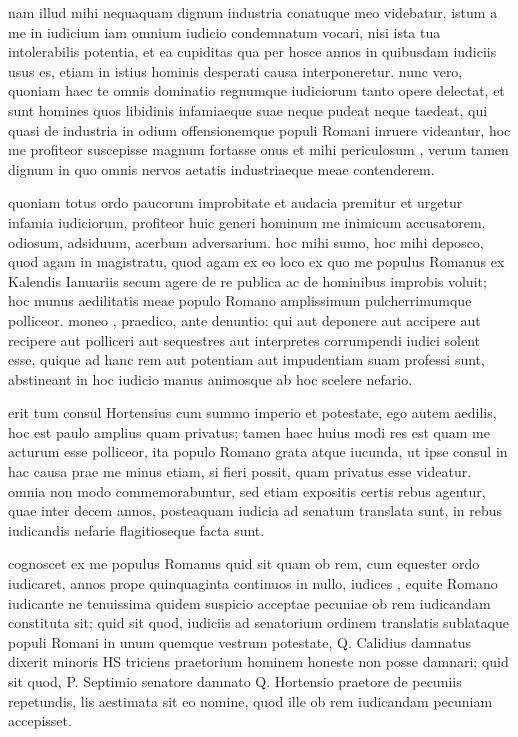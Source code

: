  nam illud mihi nequaquam dignum industria conatuque meo videbatur, istum a me in iudicium iam omnium iudicio condemnatum vocari, nisi ista tua intolerabilis potentia, et ea cupiditas qua per hosce annos in quibusdam iudiciis usus es, etiam in istius hominis desperati causa interponeretur. nunc vero, quoniam haec te omnis dominatio regnumque iudiciorum tanto opere delectat, et sunt homines quos libidinis infamiaeque suae neque pudeat neque taedeat, qui quasi de industria in odium offensionemque populi Romani inruere videantur, hoc me profiteor suscepisse magnum fortasse onus et mihi periculosum , verum tamen dignum in quo omnis nervos aetatis industriaeque meae contenderem.

 quoniam totus ordo paucorum improbitate et audacia premitur et urgetur infamia iudiciorum, profiteor huic generi hominum me inimicum accusatorem, odiosum, adsiduum, acerbum adversarium. hoc mihi sumo, hoc mihi deposco, quod agam in magistratu, quod agam ex eo loco ex quo me populus Romanus ex Kalendis Ianuariis secum agere de re publica ac de hominibus improbis voluit; hoc munus aedilitatis meae populo Romano amplissimum pulcherrimumque polliceor. moneo , praedico, ante denuntio: qui aut deponere aut accipere aut recipere aut polliceri aut sequestres aut interpretes corrumpendi iudici solent esse, quique ad hanc rem aut potentiam aut impudentiam suam professi sunt, abstineant in hoc iudicio manus animosque ab hoc scelere nefario.

 erit tum consul Hortensius cum summo imperio et potestate, ego autem aedilis, hoc est paulo amplius quam privatus; tamen haec huius modi res est quam me acturum esse polliceor, ita populo Romano grata atque iucunda, ut ipse consul in hac causa prae me minus etiam, si fieri possit, quam privatus esse videatur. omnia non modo commemorabuntur, sed etiam expositis certis rebus agentur, quae inter decem annos, posteaquam iudicia ad senatum translata sunt, in rebus iudicandis nefarie flagitioseque facta sunt.

 cognoscet ex me populus Romanus quid sit quam ob rem, cum equester ordo iudicaret, annos prope quinquaginta continuos in nullo, iudices , equite Romano iudicante ne tenuissima quidem suspicio acceptae pecuniae ob rem iudicandam constituta sit; quid sit quod, iudiciis ad senatorium ordinem translatis sublataque populi Romani in unum quemque vestrum potestate, Q. Calidius damnatus dixerit minoris HS triciens praetorium hominem honeste non posse damnari; quid sit quod, P. Septimio senatore damnato Q. Hortensio praetore de pecuniis repetundis, lis aestimata sit eo nomine, quod ille ob rem iudicandam pecuniam accepisset.

